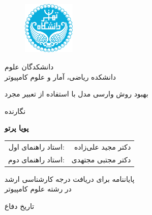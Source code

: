 \documentclass[12pt]{report}
\begin{document}

\begin{figure}
\centering
\includegraphics[height=2.5cm]{UT-Logo.png}
\end{figure}

\begin{center}
دانشکدگان علوم
\\
دانشکده ریاضی، آمار و علوم کامپیوتر
\end{center}

\begin{center}
\end{center}

\begin{center}
\huge{بهبود روش وارسی مدل با استفاده از تعبیر مجرد}
\end{center}

\begin{center}
\end{center}

\begin{center}
نگارنده
\end{center}
\begin{center}
\textbf{
پویا پرتو
}
\end{center}

\begin{center}
\begin{tabular}{rr}
استاد راهنمای اول:& دکتر مجید علی‌زاده
\\
استاد راهنمای دوم: & دکتر مجتبی مجتهدی
\\

\end{tabular}
\end{center}

\vspace{3cm}
\begin{center}
پایاننامه برای دریافت درجه کارشناسی ارشد
\\
در رشته علوم کامپیوتر
\end{center}

\begin{center}
تاریخ دفاع
\end{center}

\pagestyle{empty}
\pagenumbering{}
\end{document}
